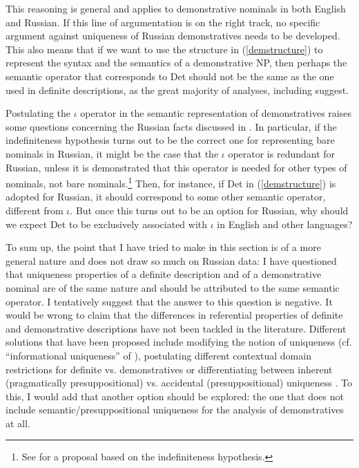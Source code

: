 \documentclass[output=paper,colorlinks,citecolor=brown]{langscibook}
\begin{document}
This reasoning is general and applies to demonstrative nominals in both English and Russian. If this line of argumentation is on the right track, no specific argument against uniqueness of Russian demonstratives needs to be developed. This also means that if we want to use the structure in (\ref{demstructure}) to represent the syntax and the semantics of a demonstrative NP, then perhaps the semantic operator that corresponds to Det should not be the same as the one used in definite descriptions, as the great majority of analyses, including \citet{roberts02, wolter06, elbourne08} suggest.  

Postulating the $\iota$ operator in the semantic representation of demonstratives raises some questions concerning the Russian facts discussed in . In particular, if the indefiniteness hypothesis turns out to be the correct one for representing bare nominals in Russian, it might be the case that the $\iota$ operator is redundant for Russian, unless it is demonstrated that this operator is needed for other types of nominals, not bare nominals.\footnote{See \citet{Simik2021} for a proposal based on the indefiniteness hypothesis.} Then, for instance, if Det in (\ref{demstructure}) is adopted for Russian, it should correspond to some other semantic operator, different from $\iota$. But once this turns out to be an option for Russian, why should we expect Det to be exclusively associated with $\iota$ in English and other languages? 

To sum up, the point that I have tried to make in this section is of a more general nature and does not draw so much on Russian data: I have questioned that uniqueness properties of a definite description and of a demonstrative nominal are of the same nature and should be attributed to the same semantic operator. I tentatively suggest that the answer to this question is negative. It would be wrong to claim that the differences in referential properties of definite and demonstrative descriptions have not been tackled in the literature. Different solutions that have been proposed include modifying the notion of uniqueness (cf. ``informational uniqueness'' of \citealt{roberts02}), postulating different contextual domain restrictions for definite vs. demonstratives \citep[e.g.,][]{wolter06} or differentiating between inherent (pragmatically presuppositional) vs. accidental (presuppositional) uniqueness \citep{Simik2021}. To this, I would add that another option should be explored: the one that does not include semantic/presuppositional uniqueness for the analysis of demonstratives at all. 
\end{document}
